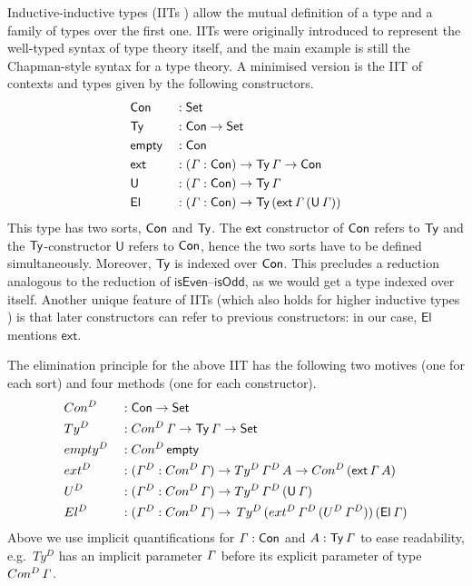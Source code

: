 \documentclass[a4paper,UKenglish,cleveref, autoref]{lipics-v2019}
\begin{document}
Inductive-inductive types (IITs \cite{forsberg-phd}) allow the mutual
definition of a type and a family of types over the first one. IITs
were originally introduced to represent the well-typed syntax of type
theory itself, and the main example is still the Chapman-style
\cite{chapman09eatitself} syntax for a type theory. A minimised version
is the IIT of contexts and types given by the following constructors.
\begin{alignat*}{5}
  & \mathsf{Con} && : \mathsf{Set} \\
  & \mathsf{Ty} && : \mathsf{Con}\rightarrow\mathsf{Set} \\
  & \mathsf{empty} && : \mathsf{Con} \\
  & \mathsf{ext} && : (\mathit{\Gamma}:\mathsf{Con})\rightarrow\mathsf{Ty}\,\mathit{\Gamma}\rightarrow\mathsf{Con} \\
  & \mathsf{U} && : (\mathit{\Gamma}:\mathsf{Con})\rightarrow\mathsf{Ty}\,\mathit{\Gamma} \\
  & \mathsf{El} && : (\mathit{\Gamma}:\mathsf{Con})\rightarrow\mathsf{Ty}\,(\mathsf{ext}\,\mathit{\Gamma}\,(\mathsf{U}\,\mathit{\Gamma}))
\end{alignat*}
This type has two sorts, $\mathsf{Con}$ and $\mathsf{Ty}$. The $\mathsf{ext}$ constructor of
$\mathsf{Con}$ refers to $\mathsf{Ty}$ and the $\mathsf{Ty}$-constructor $\mathsf{U}$ refers to $\mathsf{Con}$,
hence the two sorts have to be defined simultaneously. Moreover, $\mathsf{Ty}$ is
indexed over $\mathsf{Con}$. This precludes a reduction analogous to the reduction of
$\mathsf{isEven}$--$\mathsf{isOdd}$, as we would get a type indexed over
itself. Another unique feature of IITs (which also holds for higher inductive
types \cite{HoTTbook}) is that later constructors can refer to previous
constructors: in our case, $\mathsf{El}$ mentions
$\mathsf{ext}$.

The elimination principle for the above IIT has the following two
motives (one for each sort) and four methods (one for each
constructor).
\begin{alignat*}{5}
  & Con^D && : \mathsf{Con}\rightarrow\mathsf{Set} \\
  & Ty^D && : Con^D\,\mathit{\Gamma}\rightarrow\mathsf{Ty}\,\mathit{\Gamma}\rightarrow\mathsf{Set} \\
  & {empty}^D && : Con^D\,\mathsf{empty} \\
  & {ext}^D && : (\mathit{\Gamma}^D:Con^D\,\mathit{\Gamma})\rightarrow Ty^D\,\mathit{\Gamma}^D\,A\rightarrow Con^D\,(\mathsf{ext}\,\mathit{\Gamma}\,A) \\
  & U^D && : (\mathit{\Gamma}^D:Con^D\,\mathit{\Gamma})\rightarrow Ty^D\,\mathit{\Gamma}^D\,(\mathsf{U}\,\mathit{\Gamma}) \\
  & El^D && : (\mathit{\Gamma}^D:Con^D\,\mathit{\Gamma})\rightarrow\,Ty^D\,({ext}^D\,\mathit{\Gamma}^D\,(U^D\,\mathit{\Gamma}^D))\,(\mathsf{El}\,\mathit{\Gamma})
\end{alignat*}
Above we use implicit quantifications for $\mathit{\Gamma}:\mathsf{Con}$ and
$A:\mathsf{Ty}\,\mathit{\Gamma}$ to ease readability, e.g.\ $Ty^D$ has an implicit
parameter $\mathit{\Gamma}$ before its explicit parameter of type
$Con^D\,\mathit{\Gamma}$.
\end{document}
